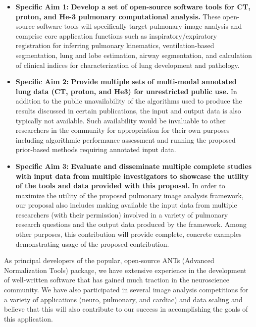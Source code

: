 \documentclass[11pt,]{article}
\begin{document}
\begin{itemize}
\itemsep1pt\parskip0pt
\item
  \textbf{Specific Aim 1:} \textbf{Develop a set of open-source software
  tools for CT, proton, and He-3 pulmonary computational analysis.}
  These open-source software tools will specifically target pulmonary
  image analysis and comprise core application functions such as
  inspiratory/expiratory registration for inferring pulmonary
  kinematics, ventilation-based segmentation, lung and lobe estimation,
  airway segmentation, and calculation of clinical indices for
  characterization of lung development and pathology.
\item
  \textbf{Specific Aim 2:} \textbf{Provide multiple sets of multi-modal
  annotated lung data (CT, proton, and He3) for unrestricted public
  use.} In addition to the public unavailability of the algorithms used
  to produce the results discussed in certain publications, the input
  and output data is also typically not available. Such availability
  would be invaluable to other researchers in the community for
  appropriation for their own purposes including algorithmic performance
  assessment and running the proposed prior-based methods requiring
  annotated input data.
\item
  \textbf{Specific Aim 3:} \textbf{Evaluate and disseminate multiple
  complete studies with input data from multiple investigators to
  showcase the utility of the tools and data provided with this
  proposal.} In order to maximize the utility of the proposed pulmonary
  image analysis framework, our proposal also includes making available
  the input data from multiple researchers (with their permission)
  involved in a variety of pulmonary research questions and the output
  data produced by the framework. Among other purposes, this
  contribution will provide complete, concrete examples demonstrating
  usage of the proposed contribution.
\end{itemize}

As principal developers of the popular, open-source ANTs (Advanced
Normalization Tools) package, we have extensive experience in the
development of well-written software that has gained much traction in
the neuroscience community. We have also participated in several image
analysis competitions for a variety of applications (neuro, pulmonary,
and cardiac) and data scaling and believe that this will also contribute
to our success in accomplishing the goals of this application.
\end{document}
